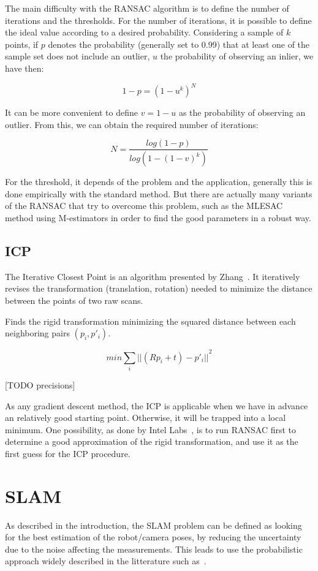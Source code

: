 The main difficulty with the RANSAC algorithm is to define the number of iterations and the thresholds.
For the number of iterations, it is possible to define the ideal value according to a desired probability. Considering a sample of $k$ points, if $p$ denotes the probability (generally set to 0.99) that at least one of the sample set does not include an outlier, $u$ the probability of observing an inlier, we have then:

\[
1-p = (1-u^k)^N
\]

It can be more convenient to define $v=1-u$ as the probability of observing an outlier. From this, we can obtain the required number of iterations:

\[
N = \frac{log(1-p)}{log(1-(1-v)^k)}
\]

For the threshold, it depends of the problem and the application, generally this is done empirically with the standard method. But there are actually many variants of the RANSAC that try to overcome this problem, such as the MLESAC method \cite{TorrZ00} using M-estimators in order to find the good parameters in a robust way.


\subsection{ICP}

The Iterative Closest Point is an algorithm presented by Zhang~\cite{zhang_92_icp}.
It iteratively revises the transformation (translation, rotation) needed to minimize the distance between the points of two raw scans.

Finds the rigid transformation minimizing the squared distance between each neighboring pairs $(p_{i}, p'_{i})$.

\[min \sum_{i}{||(Rp_{i}+t)-p'_{i}||}^2\]

[TODO precisions]

As any gradient descent method, the ICP is applicable when we have in advance an relatively good starting point. Otherwise, it will be trapped into a local minimum. One possibility, as done by Intel Labs~\cite{Intel_RGBD_2010}, is to run RANSAC first to determine a good approximation of the rigid transformation, and use it as the first guess for the ICP procedure.

\section{SLAM}

As described in the introduction, the SLAM problem can be defined as looking for the best estimation of the robot/camera poses, by reducing the uncertainty due to the noise affecting the measurements. This leads to use the probabilistic approach widely described in the litterature such as~\cite{Thrun_2005}.

